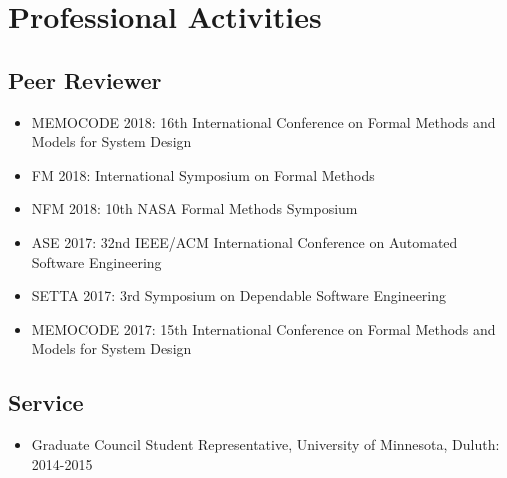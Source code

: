 \documentclass[11pt,a4paper,sans]{moderncv}        %
\begin{document}
\newpage
\section{Professional Activities}
\subsection{\textbf{Peer Reviewer}}
\begin{itemize}
\item MEMOCODE 2018: 16th International Conference on Formal Methods and Models for System Design
\item FM 2018: International Symposium on Formal Methods
\item NFM 2018: 10th NASA Formal Methods Symposium
\item ASE 2017: 32nd IEEE/ACM International Conference on Automated Software Engineering
\item SETTA 2017: 3rd Symposium on Dependable Software Engineering
\item MEMOCODE 2017: 15th International Conference on Formal Methods and Models for System Design
\end{itemize}
\vspace{0.1in}

\subsection{\textbf{Service}}
\begin{itemize}
\item  Graduate Council Student Representative, University of Minnesota, Duluth: 2014-2015
\end{itemize}



\end{document}
